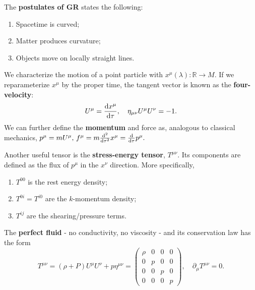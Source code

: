 \documentclass{article}
\begin{document}
The \textbf{postulates of GR} states the following:
\begin{enumerate}
    \item Spacetime is curved;
    \item Matter produces curvature;
    \item Objects move on locally straight lines.
\end{enumerate}

We characterize the motion of a point particle with $x^\mu(\lambda):\mathbb R\to M$. If we reparameterize $x^\mu$ by the proper time, the tangent vector is known as the \textbf{four-velocity}:
$$U^\mu=\frac{\mathrm{d}x^\mu}{\mathrm{d}\tau},\quad \eta_{\mu\nu}U^\mu U^\nu=-1.$$
We can further define the \textbf{momentum} and force as, analogous to classical mechanics, $p^\mu=mU^\mu,\,f^\mu=m\frac{\mathrm{d}^{2}}{\mathrm{d}{\tau}^{2}} x^\mu=\frac{\mathrm{d}}{\mathrm{d}\tau} p^\mu.$



Another useful tensor is the \textbf{stress-energy tensor}, $T^{\mu\nu}$. Its components are defined as the flux of $p^\mu$ in the $x^\nu$ direction. More specifically,
\begin{enumerate}
    \item $T^{00}$ is the rest energy density;
    \item $T^{0i}=T^{i0}$ are the $k$-momentum density;
    \item $T^{ij}$ are the shearing/pressure terms.
\end{enumerate}
The \textbf{perfect fluid} - no conductivity, no viscosity - and its conservation law has the form 
$$T^{\mu\nu}=(\rho+P)U^\mu U^\nu+p\eta^{\mu\nu}=\begin{pmatrix}\rho&0&0&0\\0&p&0&0\\0&0&p&0\\0&0&0&p\end{pmatrix},\quad\partial_\mu T^{\mu\nu}=0.$$
\end{document}
